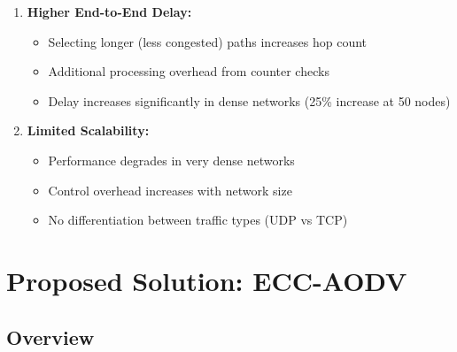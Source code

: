 \documentclass[12pt,a4paper]{article}
\begin{document}
\begin{enumerate}
    \item \textbf{Higher End-to-End Delay:}
    \begin{itemize}
        \item Selecting longer (less congested) paths increases hop count
        \item Additional processing overhead from counter checks
        \item Delay increases significantly in dense networks (25\% increase at 50 nodes)
    \end{itemize}
    
    \item \textbf{Limited Scalability:}
    \begin{itemize}
        \item Performance degrades in very dense networks 
        \item Control overhead increases with network size
        \item No differentiation between traffic types (UDP vs TCP)
    \end{itemize}
\end{enumerate}




\section{Proposed Solution: ECC-AODV}

\subsection{Overview}
\end{document}
